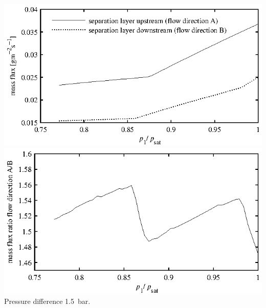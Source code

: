 \documentclass{minimal}
\begin{document}
\includegraphics{figure5.eps}
\includegraphics{figure6.eps}
Pressure difference 1.5~bar.
\end{document}
